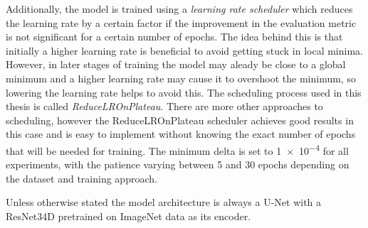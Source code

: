 Additionally, the model is trained using a \emph{learning rate scheduler} which reduces the learning rate by a certain factor if the improvement in the evaluation metric is not significant for a certain number of epochs. The idea behind this is that initially a higher learning rate is beneficial to avoid getting stuck in local minima. However, in later stages of training the model may aleady be close to a global minimum and a higher learning rate may cause it to overshoot the minimum, so lowering the learning rate helps to avoid this. The scheduling process used in this thesis is called \emph{ReduceLROnPlateau}. There are more other approaches to scheduling, however the ReduceLROnPlateau scheduler achieves good results in this case and is easy to implement without knowing the exact number of epochs that will be needed for training. The minimum delta is set to \num{1e-4} for all experiments, with the patience varying between 5 and 30 epochs depending on the dataset and training approach.

Unless otherwise stated the model architecture is always a U-Net with a ResNet34D pretrained on ImageNet data as its encoder.